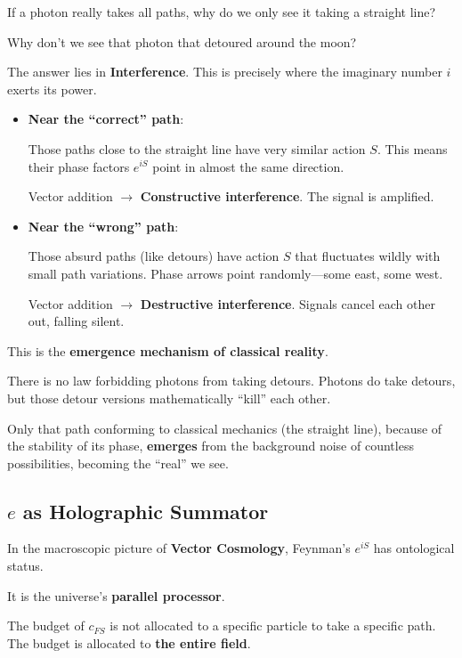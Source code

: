 \documentclass[11pt,a4paper,twoside]{book}
\begin{document}
If a photon really takes all paths, why do we only see it taking a straight line?

Why don't we see that photon that detoured around the moon?

The answer lies in \textbf{Interference}. This is precisely where the imaginary number $i$ exerts its power.

\begin{itemize}
\item \textbf{Near the ``correct'' path}:

    Those paths close to the straight line have very similar action $S$. This means their phase factors $e^{iS}$ point in almost the same direction.

    Vector addition $\rightarrow$ \textbf{Constructive interference}. The signal is amplified.

\item \textbf{Near the ``wrong'' path}:

    Those absurd paths (like detours) have action $S$ that fluctuates wildly with small path variations. Phase arrows point randomly---some east, some west.

    Vector addition $\rightarrow$ \textbf{Destructive interference}. Signals cancel each other out, falling silent.
\end{itemize}

This is the \textbf{emergence mechanism of classical reality}.

There is no law forbidding photons from taking detours. Photons do take detours, but those detour versions mathematically ``kill'' each other.

Only that path conforming to classical mechanics (the straight line), because of the stability of its phase, \textbf{emerges} from the background noise of countless possibilities, becoming the ``real'' we see.

\subsection{$e$ as Holographic Summator}

In the macroscopic picture of \textbf{Vector Cosmology}, Feynman's $e^{iS}$ has ontological status.

It is the universe's \textbf{parallel processor}.

The budget of $c_{FS}$ is not allocated to a specific particle to take a specific path. The budget is allocated to \textbf{the entire field}.
\end{document}
